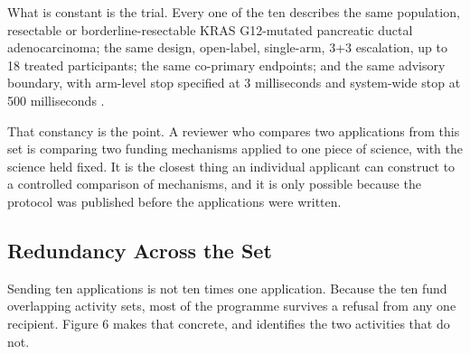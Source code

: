 What is constant is the trial. Every one of the ten describes the same
population, resectable or borderline-resectable KRAS G12-mutated pancreatic
ductal adenocarcinoma; the same design, open-label, single-arm, 3+3 escalation,
up to 18 treated participants; the same co-primary endpoints; and the same
advisory boundary, with arm-level stop specified at 3 milliseconds and
system-wide stop at 500 milliseconds \cite{onpremwhippl,phase1ind}.

That constancy is the point. A reviewer who compares two applications from this
set is comparing two funding mechanisms applied to one piece of science, with
the science held fixed. It is the closest thing an individual applicant can
construct to a controlled comparison of mechanisms, and it is only possible
because the protocol was published before the applications were written.

\subsection{Redundancy Across the Set}

Sending ten applications is not ten times one application. Because the ten fund
overlapping activity sets, most of the programme survives a refusal from any one
recipient. Figure 6 makes that concrete, and identifies the two activities that
do not.

